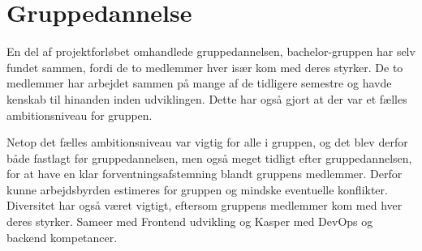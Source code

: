 \section{Gruppedannelse}

En del af projektforløbet omhandlede gruppedannelsen, bachelor-gruppen har selv fundet sammen, fordi de to medlemmer hver især kom med deres styrker. De to medlemmer har arbejdet sammen på mange af de tidligere semestre og havde kenskab til hinanden inden udviklingen. Dette har også gjort at der var et fælles ambitionsniveau for gruppen.

Netop det fælles ambitionsniveau var vigtig for alle i gruppen, og det blev derfor både fastlagt før gruppedannelsen, men også meget tidligt efter gruppedannelsen, for at have en klar forventningsafstemning blandt gruppens medlemmer. Derfor kunne arbejdsbyrden estimeres for gruppen og mindske eventuelle konflikter. Diversitet har også været vigtigt, eftersom gruppens medlemmer kom med hver deres styrker. Sameer med Frontend udvikling og Kasper med DevOps og backend kompetancer.